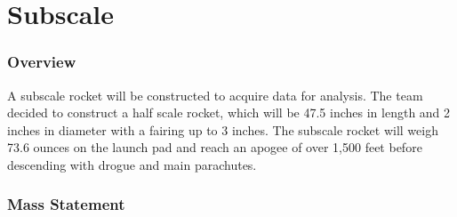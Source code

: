\chapter{Subscale}
\subsection{Overview}
A subscale rocket will be constructed to acquire data for analysis. The team decided to construct a half scale rocket, which will be 47.5 inches in length and 2 inches in diameter with a fairing up to 3 inches. The subscale rocket will weigh 73.6 ounces on the launch pad and reach an apogee of over 1,500 feet before descending with drogue and main parachutes.
    

 \subsection{Mass Statement}
